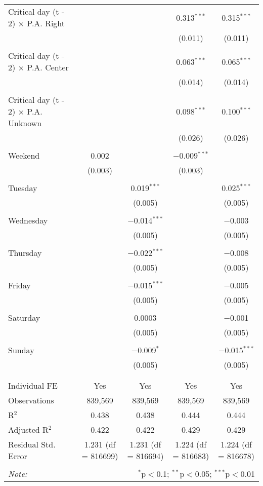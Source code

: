 \documentclass[
]{article}
\begin{document}
\begin{table}[!htbp]
{\begin{tabular}{@{\extracolsep{5pt}}lcccc}
 Critical day (t - 2) $\times$ P.A. Right &  &  & 0.313$^{***}$ & 0.315$^{***}$ \\ 
  &  &  & (0.011) & (0.011) \\ 
  & & & & \\ 
 Critical day (t - 2) $\times$ P.A. Center &  &  & 0.063$^{***}$ & 0.065$^{***}$ \\ 
  &  &  & (0.014) & (0.014) \\ 
  & & & & \\ 
 Critical day (t - 2) $\times$ P.A. Unknown &  &  & 0.098$^{***}$ & 0.100$^{***}$ \\ 
  &  &  & (0.026) & (0.026) \\ 
  & & & & \\ 
 Weekend & 0.002 &  & $-$0.009$^{***}$ &  \\ 
  & (0.003) &  & (0.003) &  \\ 
  & & & & \\ 
 Tuesday &  & 0.019$^{***}$ &  & 0.025$^{***}$ \\ 
  &  & (0.005) &  & (0.005) \\ 
  & & & & \\ 
 Wednesday &  & $-$0.014$^{***}$ &  & $-$0.003 \\ 
  &  & (0.005) &  & (0.005) \\ 
  & & & & \\ 
 Thursday &  & $-$0.022$^{***}$ &  & $-$0.008 \\ 
  &  & (0.005) &  & (0.005) \\ 
  & & & & \\ 
 Friday &  & $-$0.015$^{***}$ &  & $-$0.005 \\ 
  &  & (0.005) &  & (0.005) \\ 
  & & & & \\ 
 Saturday &  & 0.0003 &  & $-$0.001 \\ 
  &  & (0.005) &  & (0.005) \\ 
  & & & & \\ 
 Sunday &  & $-$0.009$^{*}$ &  & $-$0.015$^{***}$ \\ 
  &  & (0.005) &  & (0.005) \\ 
  & & & & \\ 
\hline \\[-1.8ex] 
Individual FE & Yes & Yes & Yes & Yes \\ 
Observations & 839,569 & 839,569 & 839,569 & 839,569 \\ 
R$^{2}$ & 0.438 & 0.438 & 0.444 & 0.444 \\ 
Adjusted R$^{2}$ & 0.422 & 0.422 & 0.429 & 0.429 \\ 
Residual Std. Error & 1.231 (df = 816699) & 1.231 (df = 816694) & 1.224 (df = 816683) & 1.224 (df = 816678) \\ 
\hline 
\hline \\[-1.8ex] 
\textit{Note:}  & \multicolumn{4}{r}{$^{*}$p$<$0.1; $^{**}$p$<$0.05; $^{***}$p$<$0.01} \\ 
\end{tabular}
} 
\end{table} 
\newpage
\end{document}

